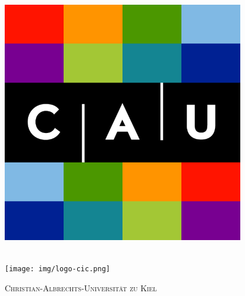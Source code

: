 \begin{titlepage}
    \centering
    \begin{adjustbox}{max width=1.2\linewidth, right}
        \begin{minipage}[c][0.99\textheight][t]{0.13\textwidth}
            \centering
            \includegraphics[width=\linewidth]{img/logo-ipn.png} \\
            \vspace{5mm}
            \hskip3pt
            {\color{red_cic} \vrule width1.5pt height0.75\textheight} 
            \hskip5pt
            {\color{black_cic} \vrule width2.5pt height0.75\textheight} 
            \hskip3pt
            {\color{yellow_cic} \vrule width1.5pt height0.75\textheight} \\
            \vspace{5mm}
            \centerline{\texttt{[image: img/logo-cic.png]}}
        \end{minipage}
        \begin{minipage}[c][0.99\textheight][t]{0.95\textwidth}
            \centering
            {\fontsize{24}{24}\selectfont\textsc{Christian-Albrechts-Universität zu Kiel\\}}
            \vspace{10pt}
            \begin{minipage}[t]{0.1\textwidth}

\end{minipage}
\end{minipage}
\end{adjustbox}
\end{titlepage}

